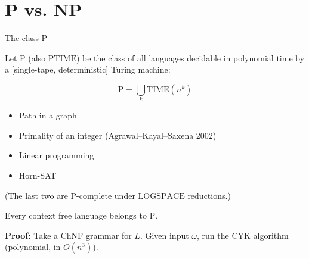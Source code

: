 \documentclass[handout]{beamer}
\begin{document}
\section*{P vs. NP}


\begin{frame}{The class $\mathrm{P}$}

    \begin{definition}
        Let \alert{$\mathrm{P}$} (also \alert{$\mathrm{PTIME}$}) be the class of all languages decidable in \alert{polynomial time} by a [single-tape, deterministic] Turing machine:

        \vspace{-18pt}
        $$
        \mathrm{P}=\bigcup_k \mathrm{TIME}(n^k)
        $$
        \vspace{-9pt}
    \end{definition}
    \vspace{-9pt}
    \begin{itemize}
        \item Path in a graph
        \item Primality of an integer (Agrawal–Kayal–Saxena 2002)
        \item Linear programming
        \item Horn-SAT
    \end{itemize}
    \vspace{-3pt}
    (The last two are $\mathrm{P}$-complete under $\mathrm{LOGSPACE}$ reductions.)

    \medskip

    \begin{theorem}
        Every context free language belongs to $\mathrm{P}$.
    \end{theorem}  
    
    \vspace{-10pt}
    \textbf{Proof:}
        Take a ChNF grammar for $L$. Given input $\omega$, run the CYK algorithm (polynomial, in $O(n^3)$).\hfill\qedsymbol

\end{frame}
\end{document}
